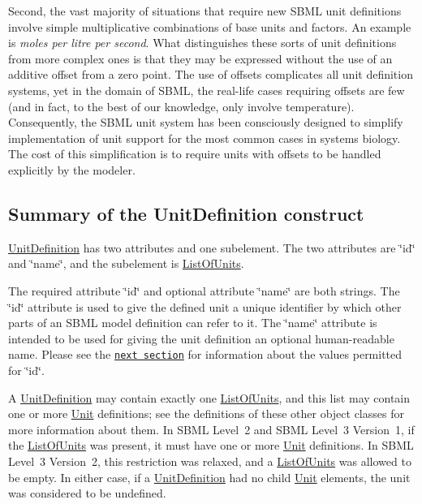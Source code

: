 Second, the vast majority of situations that require new S\+B\+ML unit definitions involve simple multiplicative combinations of base units and factors. An example is {\itshape moles per litre per second}. What distinguishes these sorts of unit definitions from more complex ones is that they may be expressed without the use of an additive offset from a zero point. The use of offsets complicates all unit definition systems, yet in the domain of S\+B\+ML, the real-\/life cases requiring offsets are few (and in fact, to the best of our knowledge, only involve temperature). Consequently, the S\+B\+ML unit system has been consciously designed to simplify implementation of unit support for the most common cases in systems biology. The cost of this simplification is to require units with offsets to be handled explicitly by the modeler.\hypertarget{class_unit_definition_unitdef-summary}{}\subsection{Summary of the Unit\+Definition construct}\label{class_unit_definition_unitdef-summary}
\hyperlink{class_unit_definition}{Unit\+Definition} has two attributes and one subelement. The two attributes are \char`\"{}id\char`\"{} and \char`\"{}name\char`\"{}, and the subelement is \hyperlink{class_list_of_units}{List\+Of\+Units}.

The required attribute \char`\"{}id\char`\"{} and optional attribute \char`\"{}name\char`\"{} are both strings. The \char`\"{}id\char`\"{} attribute is used to give the defined unit a unique identifier by which other parts of an S\+B\+ML model definition can refer to it. The \char`\"{}name\char`\"{} attribute is intended to be used for giving the unit definition an optional human-\/readable name. Please see the \href{#unitdef-id}{\tt next section} for information about the values permitted for \char`\"{}id\char`\"{}.

A \hyperlink{class_unit_definition}{Unit\+Definition} may contain exactly one \hyperlink{class_list_of_units}{List\+Of\+Units}, and this list may contain one or more \hyperlink{class_unit}{Unit} definitions; see the definitions of these other object classes for more information about them. In S\+B\+ML Level~2 and S\+B\+ML Level~3 Version~1, if the \hyperlink{class_list_of_units}{List\+Of\+Units} was present, it must have one or more \hyperlink{class_unit}{Unit} definitions. In S\+B\+ML Level~3 Version~2, this restriction was relaxed, and a \hyperlink{class_list_of_units}{List\+Of\+Units} was allowed to be empty. In either case, if a \hyperlink{class_unit_definition}{Unit\+Definition} had no child \hyperlink{class_unit}{Unit} elements, the unit was considered to be undefined.

